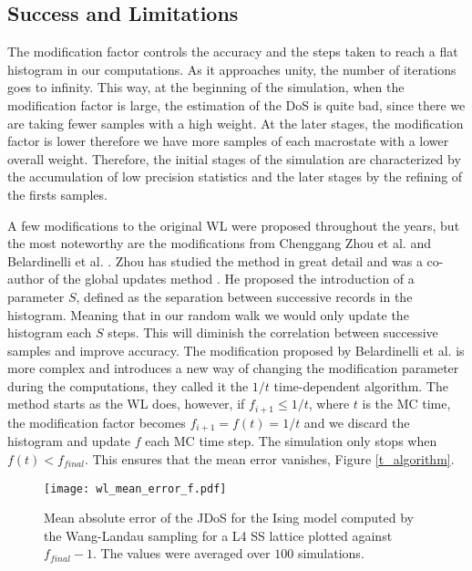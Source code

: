 \subsection{Success and Limitations}

The modification factor controls the accuracy and the steps taken to reach a flat histogram in our computations. As it approaches unity, the number of iterations goes to infinity. This way, at the beginning of the simulation, when the modification factor is large, the estimation of the DoS is quite bad, since there we are taking fewer samples with a high weight. At the later stages, the modification factor is lower therefore we have more samples of each macrostate with a lower overall weight. 
Therefore, the initial stages of the simulation are characterized by the accumulation of low precision statistics and the later stages by the refining of the firsts samples. 



	A few modifications to the original WL were proposed throughout the years, but the most noteworthy  are the modifications from Chenggang Zhou et al. \cite{Zhou2005} and Belardinelli et al. \cite{Belardinelli2007}. Zhou has studied the method in great detail \cite{Zhou2005} and was a co-author of the global updates method \cite{WL_Cont}. He proposed the introduction of a parameter $S$, defined as the separation between successive records in the histogram. Meaning that in our random walk we would only update the histogram each $S$ steps. This will diminish the correlation between successive samples and improve accuracy.  
The modification proposed by Belardinelli et al. is more complex and introduces a new way of changing the modification parameter during the computations, they called it the $1/t$ time-dependent algorithm. The method starts as the WL does, however, if $f_{i+1} \leqslant 1/t$, where $t$ is the MC time, the modification factor becomes $f_{i+1} = f(t) = 1/t$ and we discard the histogram and update $f$ each MC time step. The simulation only stops when $f(t) < f_{final}$. This ensures that the mean error vanishes, Figure \ref{t_algorithm}.


\begin{figure}[h]
	\centering
	\texttt{[image: wl\_mean\_error\_f.pdf]}
	\caption{Mean absolute error of the JDoS for the Ising model computed by the Wang-Landau sampling for a L4 SS lattice plotted against $f_{final}-1$. The values were averaged over $100$ simulations. }
	\label{error_abs_wl}
\end{figure}


